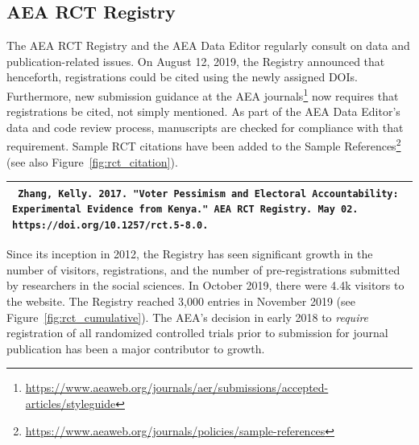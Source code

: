 \documentclass[PP]{AEA}
\newcommand{\urlcite}[2]{#2\footnote{\url{#1}}}
\begin{document}
\subsection{AEA RCT Registry}

The AEA RCT Registry and the AEA Data Editor regularly consult on data and publication-related issues. On August 12, 2019, the Registry announced that henceforth, registrations could be cited using the newly assigned \acp{DOI}. Furthermore, new \urlcite{https://www.aeaweb.org/journals/aer/submissions/accepted-articles/styleguide}{submission guidance at the AEA journals} now requires that registrations be cited, not simply mentioned. As part of the AEA Data Editor's data and code review process, manuscripts are checked for compliance with that requirement. Sample RCT citations have been added to the \urlcite{https://www.aeaweb.org/journals/policies/sample-references}{Sample References} (see also Figure~\ref{fig:rct_citation}).

\begin{minipage}{0.45\textwidth}

\begin{tabular}{p{\textwidth}}
\toprule
\texttt{
    Zhang, Kelly. 2017. "Voter Pessimism and Electoral Accountability: Experimental Evidence from Kenya." AEA RCT Registry. May 02. https://doi.org/10.1257/rct.5-8.0.
}\\
\bottomrule
\end{tabular}
    \label{fig:rct_citation}
\end{minipage}

Since its inception in 2012, the Registry has seen significant growth in the number of visitors, registrations, and the number of pre-registrations submitted by researchers in the social sciences. In October 2019, there were 4.4k visitors to the website. The Registry reached 3,000 entries in November 2019 (see Figure~\ref{fig:rct_cumulative}).  The AEA’s decision in early 2018 to \textit{require} registration of all randomized controlled trials prior to submission for journal publication  has been a major contributor to growth. 
\end{document}
